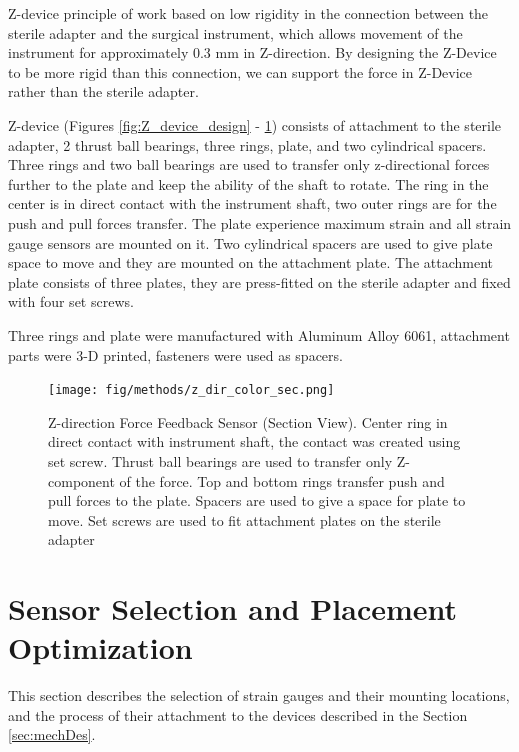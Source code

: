 Z-device principle of work based on low rigidity in the connection between the sterile adapter and the surgical instrument, which allows movement of the instrument for approximately 0.3 mm in Z-direction. By designing the Z-Device to be more rigid than this connection, we can support the force in Z-Device rather than the sterile adapter. 

Z-device (Figures \ref{fig:Z_device_design} - \ref{fig:Z-direction_sec}) consists of attachment to the sterile adapter, 2 thrust ball bearings, three rings, plate, and two cylindrical spacers. Three rings and two ball bearings are used to transfer only z-directional forces further to the plate and keep the ability of the shaft to rotate. The ring in the center is in direct contact with the instrument shaft, two outer rings are for the push and pull forces transfer. The plate experience maximum strain and all strain gauge sensors are mounted on it.  Two cylindrical spacers are used to give plate space to move and they are mounted on the attachment plate. The attachment plate consists of three plates, they are press-fitted on the sterile adapter and fixed with four set screws.

Three rings and plate were manufactured with Aluminum Alloy 6061, attachment parts were 3-D printed, fasteners were used as spacers.

\begin{figure}[h]
	\begin{center}
		\texttt{[image: fig/methods/z\_dir\_color\_sec.png]}
	\end{center}
	\vspace{-4mm}
	\caption[Z-direction Force Feedback Sensor (Section View)]
	{Z-direction Force Feedback Sensor (Section View). Center ring in direct contact with instrument shaft, the contact was created using set screw. Thrust ball bearings are used to transfer only Z-component of the force. Top and bottom rings transfer push and pull forces to the plate. Spacers are used to give a space for plate to move. Set screws are used to fit attachment plates on the sterile adapter}
	\label{fig:Z-direction_sec}
	\vspace{-2mm}
\end{figure}

\section{Sensor Selection and Placement Optimization}
\label{sec:SimMod}
This section describes the selection of strain gauges and their mounting locations, and the process of their attachment to the devices described in the Section \ref{sec:mechDes}.

